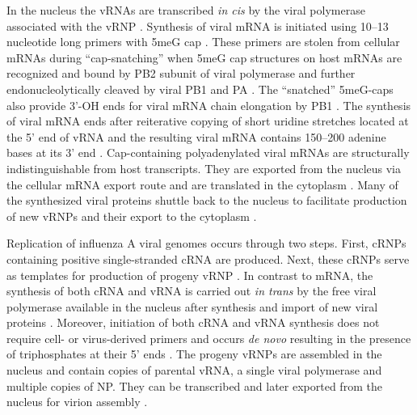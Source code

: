 	In the nucleus the \glspl{vRNA} are transcribed \textit{in cis} by the viral polymerase associated with the \gls{vRNP} \parencite{Moeller2012}. Synthesis of viral mRNA is initiated using 10--13 nucleotide long primers with \gls{5meG} cap \parencite{Beaton1981, Plotch1981a}. These primers are stolen from cellular mRNAs during ``cap-snatching'' when \gls{5meG} cap structures on host mRNAs are recognized and bound by \gls{PB2} subunit of viral polymerase \parencite{Guilligay2008} and further endonucleolytically cleaved by viral \gls{PB1} and \gls{PA} \parencite{Li2001, Dias2009, Yuan2009}. The ``snatched'' \gls{5meG}-caps also provide 3'-OH ends for viral mRNA chain elongation by \gls{PB1} \parencite{Poch1989}. The synthesis of viral mRNA ends after reiterative copying of short uridine stretches located at the 5' end of vRNA and the resulting viral mRNA contains 150--200 adenine bases at its 3' end \parencite{Plotch1977, Robertson1981d, Poon1999}. Cap-containing polyadenylated viral mRNAs are structurally indistinguishable from host transcripts. They are exported from the nucleus via the cellular mRNA export route and are translated in the cytoplasm \parencite{Chen2000, Read2010}. Many of the synthesized viral proteins  shuttle back to the nucleus to facilitate production of new \gls{vRNP}s and their export to the cytoplasm \parencite{Greenspan1988, Neumann1997, Huet2010, Wang2013}. 
	
	Replication of influenza A viral genomes occurs through two steps. First, \glspl{cRNP} containing positive single-stranded cRNA are produced. Next, these \glspl{cRNP} serve as templates for production of progeny \gls{vRNP} \parencite{Elton2005}. In contrast to mRNA, the synthesis of both cRNA and vRNA is carried out \textit{in trans} by the free viral polymerase available in the nucleus after synthesis and import of new viral proteins \parencite{Jorba2009, Moeller2012}. Moreover, initiation of both cRNA and vRNA synthesis does not require cell- or virus-derived primers and occurs \textit{de novo} resulting in the presence of triphosphates at their 5' ends \parencite{Hay1982, Zhang2010}. The progeny \gls{vRNP}s are assembled in the nucleus and contain  copies of parental vRNA, a single viral polymerase and multiple copies of \gls{NP}. They can be transcribed and later exported from the nucleus for virion assembly \parencite{Resa-Infante2011}. 
	
